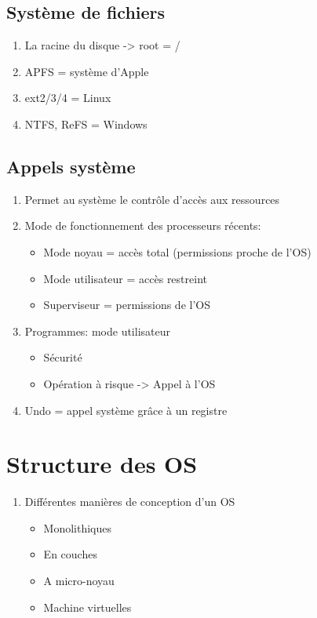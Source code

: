 \subsection{Système de fichiers}
\begin{enumerate}
  \item La racine du disque -> root = /
  \item APFS = système d'Apple
  \item ext2/3/4 = Linux
  \item NTFS, ReFS = Windows
\end{enumerate}

\subsection{Appels système}
\begin{enumerate}
\item Permet au système le contrôle d'accès aux ressources
\item Mode de fonctionnement des processeurs récents:
\begin{itemize}
  \item Mode noyau = accès total (permissions proche de l'OS)
  \item Mode utilisateur = accès restreint
  \item Superviseur = permissions de l'OS
\end{itemize}
\item Programmes: mode utilisateur
\begin{itemize}
  \item Sécurité
  \item Opération à risque -> Appel à l'OS
\end{itemize}
\item Undo = appel système grâce à un registre
\end{enumerate}

\section{Structure des OS}
\begin{enumerate}
\item Différentes manières de conception d'un OS
\begin{itemize}
  \item Monolithiques
  \item En couches
  \item A micro-noyau
  \item Machine virtuelles
\end{itemize}
\end{enumerate}

